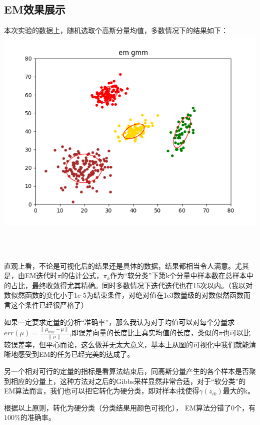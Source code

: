 \documentclass[hyperref,UTF8]{ctexart}
\begin{document}
\subsection*{EM效果展示}
本次实验的数据上，随机选取个高斯分量均值，多数情况下的结果如下：\\
\includegraphics{exp-results/EM_rand4.png}\\
\begin{table}[!htbp]
  \centering
\caption{EM拟合出的参数（顺序有所调整）}
\label{tb:lda_knn}
\end{table}\\
\\
\par 直观上看，不论是可视化后的结果还是具体的数据，结果都相当令人满意。尤其是，由EM迭代时$\pi$的估计公式，$\pi_k$作为“软分类”下第k个分量中样本数在总样本中的占比，最终收敛得尤其精确。同时多数情况下迭代迭代也在15次以内。（我以对数似然函数的变化小于1e-5为结束条件，对绝对值在1e3数量级的对数似然函数而言这个条件已经很严格了）
\par 如果一定要求定量的分析“准确率”，那么我认为对于均值可以对每个分量求$err(\mu)=\frac{\|\mu_{true} - \mu\|}{\|\mu\|}$,即误差向量的长度比上真实均值的长度，类似的$\pi$也可以比较误差率，但平心而论，这么做并无太大意义，基本上从图的可视化中我们就能清晰地感受到EM的任务已经完美的达成了。
\par 另一个相对可行的定量的指标是看算法结束后，同高斯分量产生的各个样本是否聚到相应的分量上，这种方法对之后的Gibbs采样显然非常合适，对于“软分类”的EM算法而言，我们也可以把它转化为硬分类，即对样本i找使得$\gamma(z_{ik})$最大的k。
\par 根据以上原则，转化为硬分类（分类结果用颜色可视化）， EM算法分错了0个，有$100\%$的准确率。
\end{document}
